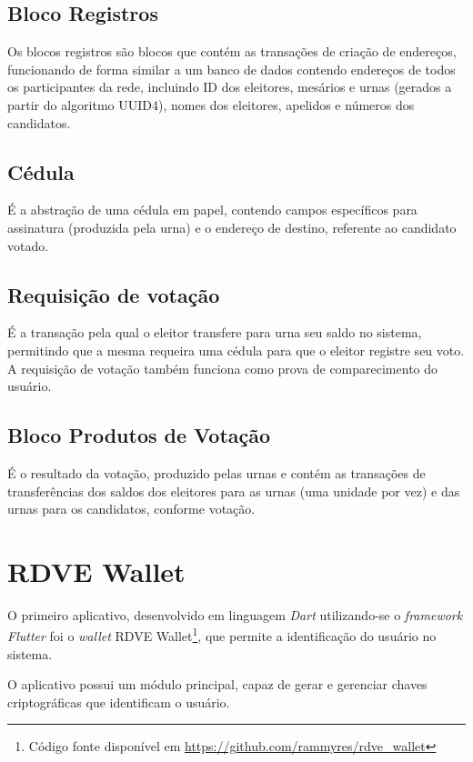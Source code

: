\subsection{Bloco Registros}

Os blocos registros são blocos que contém as transações de criação de endereços, funcionando de forma similar a um banco de dados contendo endereços de todos os participantes da rede, incluindo ID dos eleitores, mesários e urnas (gerados a partir do algoritmo UUID4), nomes dos eleitores, apelidos e números dos candidatos. 

\subsection{Cédula}
É a abstração de uma cédula em papel, contendo campos específicos para assinatura (produzida pela urna) e o endereço de destino, referente ao candidato votado.

\subsection{Requisição de votação}
É a transação pela qual o eleitor transfere para urna seu saldo no sistema, permitindo que a mesma requeira uma cédula para que o eleitor registre seu voto. A requisição de votação também funciona como prova de comparecimento do usuário. 

\subsection{Bloco Produtos de Votação}

É o resultado da votação, produzido pelas urnas e contém as transações de transferências dos saldos dos eleitores para as urnas (uma unidade por vez) e das urnas para os candidatos, conforme votação.

\section{RDVE Wallet}

O primeiro aplicativo, desenvolvido em linguagem \textit{Dart} utilizando-se o \textit{framework Flutter} foi o \textit{\gls{wallet}} RDVE Wallet\footnote{Código fonte disponível em \url{https://github.com/rammyres/rdve_wallet}}, que permite a identificação do usuário no sistema. 

O aplicativo possui um módulo principal, capaz de gerar e gerenciar chaves criptográficas que identificam o usuário. 

